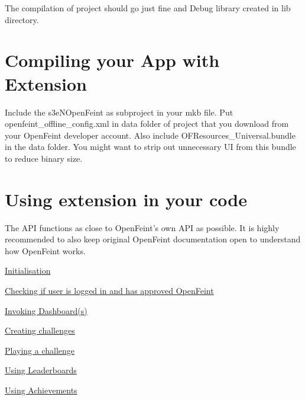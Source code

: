 The compilation of project should go just fine and Debug library created in lib directory.\hypertarget{index_sec_3}{}\section{Compiling your App with Extension}\label{index_sec_3}
Include the s3eNOpenFeint as subproject in your mkb file. Put openfeint\_\-offline\_\-config.xml in data folder of project that you download from your OpenFeint developer account. Also include OFResources\_\-Universal.bundle in the data folder. You might want to strip out unnecessary UI from this bundle to reduce binary size.\hypertarget{index_sec_4}{}\section{Using extension in your code}\label{index_sec_4}
The API functions as close to OpenFeint's own API as possible. It is highly recommended to also keep original OpenFeint documentation open to understand how OpenFeint works.

\hyperlink{index_sec_4_1}{Initialisation}

\hyperlink{index_sec_4_2}{Checking if user is logged in and has approved OpenFeint}

\hyperlink{index_sec_4_3}{Invoking Dashboard(s)}

\hyperlink{index_sec_4_4}{Creating challenges}

\hyperlink{index_sec_4_5}{Playing a challenge}

\hyperlink{index_sec_4_6}{Using Leaderboards}

\hyperlink{index_sec_4_7}{Using Achievements}

